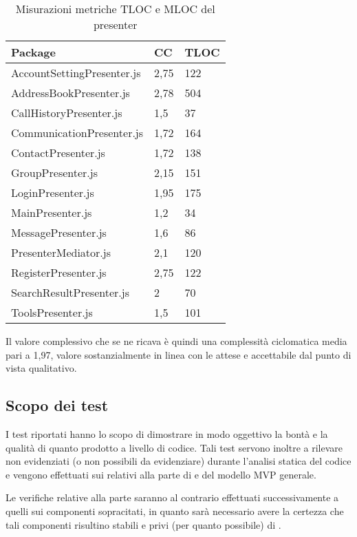 \begin{table}[H]
\centering
{}
\begin{tabular}{p{}ll}
\toprule Package & CC  & TLOC\\
\midrule
AccountSettingPresenter.js & 2,75 & 122\\
AddressBookPresenter.js & 2,78 & 504\\
CallHistoryPresenter.js & 1,5 & 37\\
CommunicationPresenter.js & 1,72 & 164\\
ContactPresenter.js & 1,72 & 138\\
GroupPresenter.js & 2,15 & 151\\ 
LoginPresenter.js & 1,95 & 175\\
MainPresenter.js & 1,2 & 34\\
MessagePresenter.js & 1,6 & 86\\
PresenterMediator.js & 2,1 & 120\\
RegisterPresenter.js & 2,75 & 122\\
SearchResultPresenter.js & 2 & 70\\
ToolsPresenter.js & 1,5 & 101\\
\bottomrule
\end{tabular}
\caption{Misurazioni metriche TLOC e MLOC del presenter} \label{tab: metricheTLOCMLOCpresenter}
\end{table}
Il valore complessivo che se ne ricava è quindi una complessità ciclomatica media pari a 1,97, valore sostanzialmente in linea con le attese e accettabile dal punto di vista qualitativo.


\subsection{Scopo dei test}
I test riportati hanno lo scopo di dimostrare in modo oggettivo la bontà e la qualità di quanto prodotto a livello di codice. Tali test servono inoltre a rilevare  non evidenziati (o non possibili da evidenziare) durante l'analisi statica del codice e vengono effettuati sui  relativi alla parte di  e  del modello MVP generale.

Le verifiche relative alla parte  saranno al contrario effettuati successivamente a quelli sui componenti sopracitati, in quanto sarà necessario avere la certezza che tali componenti risultino stabili e privi (per quanto possibile) di .

